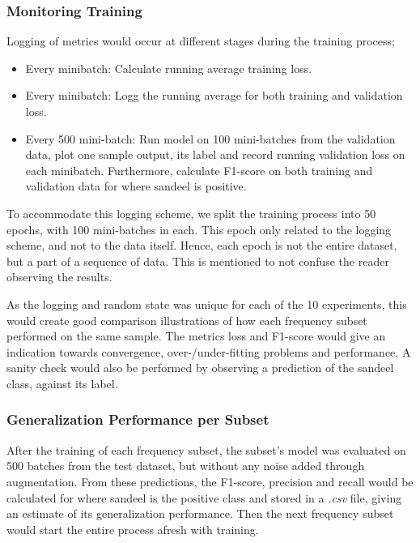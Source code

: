        \subsubsection{Monitoring Training}
        Logging of metrics would occur at different stages during the training process;
            \begin{itemize}
                \item Every minibatch: Calculate running average training loss.
                \item Every minibatch: Logg the running average for both training and validation loss.
                \item Every 500 mini-batch: Run model on 100 mini-batches from the validation data, plot one sample output, its label and record running validation loss on each minibatch. Furthermore, calculate F1-score on both training and validation data for where sandeel is positive.
            \end{itemize}
            
        To accommodate this logging scheme, we split the training process into 50 epochs, with 100 mini-batches in each. This epoch only related to the logging scheme, and not to the data itself. Hence, each epoch is not the entire dataset, but a part of a sequence of data. This is mentioned to not confuse the reader observing the results.
    
        As the logging and random state was unique for each of the 10 experiments, this would create good comparison illustrations of how each frequency subset performed on the same sample. The metrics loss and F1-score would give an indication towards convergence, over-/under-fitting problems and performance. A sanity check would also be performed by observing a prediction of the sandeel class, against its label.
        
        \subsubsection{Generalization Performance per Subset}
        After the training of each frequency subset, the subset’s model was evaluated on 500 batches from the test dataset, but without any noise added through augmentation. From these predictions, the F1-score, precision and recall would be calculated for where sandeel is the positive class and stored in a \textit{.csv} file, giving an estimate of its generalization performance. Then the next frequency subset would start the entire process afresh with training.
        
